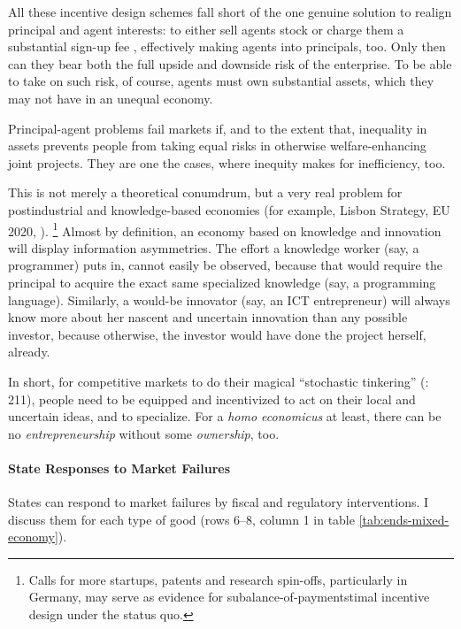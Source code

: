 All these incentive design schemes fall short of the one genuine solution to realign principal and agent interests:
to either sell agents stock or charge them a substantial sign-up fee \citep{Tirole2006}, effectively making agents into principals, too.
Only then can they bear both the full upside and downside risk of the enterprise.
To be able to take on such risk, of course, agents must own substantial assets, which they may not have in an unequal economy.

Principal-agent problems fail markets if, and to the extent that, inequality in assets prevents people from taking equal risks in otherwise welfare-enhancing joint projects.
They are one the cases, where inequity makes for inefficiency, too.

This is not merely a theoretical conumdrum, but a very real problem for postindustrial  and knowledge-based economies (for example, Lisbon Strategy, EU 2020, \citealt{Bell-1973-aa}).
\footnote{
	Calls for more startups, patents and research spin-offs, particularly in Germany, may serve as evidence for subalance-of-paymentstimal incentive design under the status quo.
}
Almost by definition, an economy based on knowledge and innovation will display information asymmetries.
The effort a knowledge worker (say, a programmer) puts in, cannot easily be observed, because that would require the principal to acquire the exact same specialized knowledge (say, a programming language).
Similarly, a would-be innovator (say, an \gls{ICT} entrepreneur) will always know more about her nascent and uncertain innovation than any possible investor, because otherwise, the investor would have done the project herself, already.

In short, for competitive markets to do their magical ``stochastic tinkering'' (\citealt{Taleb2007}: 211), people need to be equipped and incentivized to act on their local and uncertain ideas, and to specialize.
For a \emph{homo economicus} at least, there can be no \emph{entrepreneurship} without some \emph{ownership}, too.

\paragraph{State Responses to Market Failures}  \label{sec:stateresponses} States can respond to market failures by fiscal and regulatory interventions.
I discuss them for each type of good (rows 6--8, column 1 in table \ref{tab:ends-mixed-economy}).

